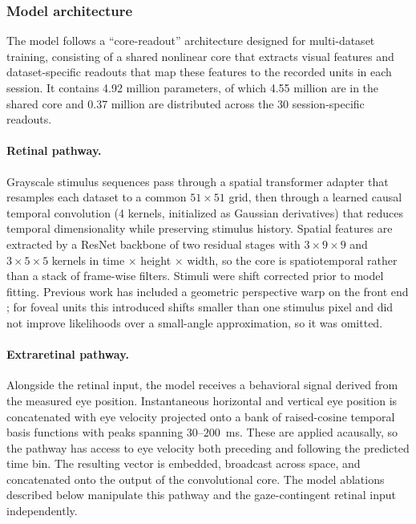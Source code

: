 \documentclass{lite}
\begin{document}
\subsubsection{Model architecture}
The model follows a ``core-readout'' architecture \cite{wang2025foundation} designed for multi-dataset training, consisting of a shared nonlinear core that extracts visual features and dataset-specific readouts that map these features to the recorded units in each session. It contains 4.92 million parameters, of which 4.55 million are in the shared core and 0.37 million are distributed across the 30 session-specific readouts.

\paragraph{Retinal pathway.} Grayscale stimulus sequences pass through a spatial transformer adapter \cite{jaderberg2015spatial} that resamples each dataset to a common $51 \times 51$ grid, then through a learned causal temporal convolution (4 kernels, initialized as Gaussian derivatives) that reduces temporal dimensionality while preserving stimulus history. Spatial features are extracted by a ResNet backbone \cite{he2016deep,he2016identity} of two residual stages with $3 \times 9 \times 9$ and $3 \times 5 \times 5$ kernels in time $\times$ height $\times$ width, so the core is spatiotemporal rather than a stack of frame-wise filters. Stimuli were shift corrected \cite{yates2023detailed} prior to model fitting. Previous work has included a geometric perspective warp on the front end \cite{wang2025foundation}; for foveal units this introduced shifts smaller than one stimulus pixel and did not improve likelihoods over a small-angle approximation, so it was omitted.

\paragraph{Extraretinal pathway.} Alongside the retinal input, the model receives a behavioral signal derived from the measured eye position. Instantaneous horizontal and vertical eye position is concatenated with eye velocity projected onto a bank of raised-cosine temporal basis functions with peaks spanning $30$--$200$~ms. These are applied acausally, so the pathway has access to eye velocity both preceding and following the predicted time bin. The resulting vector is embedded, broadcast across space, and concatenated onto the output of the convolutional core. The model ablations described below manipulate this pathway and the gaze-contingent retinal input independently.
\end{document}
